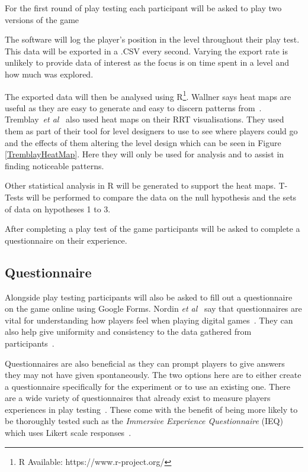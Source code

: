\documentclass[journal]{IEEEtran}
\begin{document}
For the first round of play testing each participant will be asked to play two versions of the game 

The software will log the player's position in the level throughout their play test. This data will be exported in a .CSV every second. Varying the export rate is unlikely to provide data of interest as the focus is on time spent in a level and how much was explored. 

The exported data will then be analysed using R\footnote[2]{R Available: https://www.r-project.org/}. Wallner says heat maps are useful as they are easy to generate and easy to discern patterns from~\cite{Wallner2015}.  Tremblay~\textit{et al}~\cite{Tremblay2014} also used heat maps on their RRT visualisations. They used them as part of their tool for level designers to use to see where players could go and the effects of them altering the level design which can be seen in Figure \ref{TremblayHeatMap}. Here they will only be used for analysis and to assist in finding noticeable patterns.

Other statistical analysis in R will be generated to support the heat maps. T-Tests will be performed to compare the data on the null hypothesis and the sets of data on hypotheses 1 to 3.
 
After completing a play test of the game participants will be asked to complete a questionnaire on their experience.

\subsection{Questionnaire} \label{Questionnaire}
Alongside play testing participants will also be asked to fill out a questionnaire on the game online using Google Forms. Nordin \textit{et al}~\cite{nordin2014} say that questionnaires are vital for understanding how players feel when playing digital games~\cite{nordin2014,Denisova2016}. They can also help give uniformity and consistency to the data gathered from participants~\cite{Denisova2016}.

Questionnaires are also beneficial as they can prompt players to give answers they may not have given spontaneously. The two options here are to either create a questionnaire specifically for the experiment or to use an existing one. There are a wide variety of questionnaires that already exist to measure players experiences in play testing~\cite{nordin2014,Jennett2008}. These come with the benefit of being more likely to be thoroughly tested such as the \textit{Immersive Experience
Questionnaire} (IEQ) which uses Likert scale responses~\cite{nordin2014,Jennett2008}.
 
\end{document}
